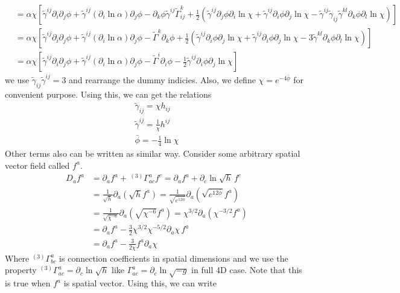 \documentclass[prd]{revtex4}
\begin{document}
\begin{align}
				&=\alpha \chi [ \tilde{\gamma}^{ij} \partial_i \partial_j \phi +  \tilde{\gamma}^{ij} (\partial_i \ln \alpha) \partial_j \phi - \partial_k \phi \tilde{\gamma}^{ij} \tilde{\Gamma}_{ij}^k + \frac{1}{2}( \tilde{\gamma}^{ij} \partial_j \phi \partial_i \ln \chi + \tilde{\gamma}^{ij} \partial_i \phi \partial_j \ln \chi -\tilde{\gamma}^{ij} \tilde{\gamma}_{ij} \tilde{\gamma}^{kl} \partial_k \phi \partial_l \ln \chi)] \nonumber \\
				&=\alpha \chi [ \tilde{\gamma}^{ij} \partial_i \partial_j \phi +  \tilde{\gamma}^{ij} (\partial_i \ln \alpha) \partial_j \phi - \tilde{\Gamma}^k \partial_k \phi + \frac{1}{2}( \tilde{\gamma}^{ij} \partial_i \phi \partial_j \ln \chi +  \tilde{\gamma}^{ij} \partial_i \phi \partial_j \ln \chi -3 \tilde{\gamma}^{kl} \partial_k \phi \partial_l \ln \chi)] \nonumber \\
				&=\alpha \chi [ \tilde{\gamma}^{ij} \partial_i \partial_j \phi +   \tilde{\gamma}^{ij} (\partial_i \ln \alpha) \partial_j \phi -  \tilde{\Gamma}^i \partial_i \phi - \frac{1}{2} \tilde{\gamma}^{ij} \partial_i \phi \partial_j \ln \chi ]
\end{align}
we use $\tilde{\gamma}_{ij} \tilde{\gamma}^{ij} = 3$ and rearrange the dummy indicies. Also, we define $\chi = e^{-4 \bar{\phi}}$ for convenient purpose. Using this, we can get the relations
\begin{align}
\tilde{\gamma}_{ij} = \chi h_{ij} \\
\tilde{\gamma}^{ij} = \frac{1}{\chi} h^{ij} \\
\bar{\phi} = -\frac{1}{4} \ln \chi
\end{align}
Other terms also can be written as similar way. Consider some arbitrary spatial vector field called $f^a$.
\begin{align}
D_a f^a &= \partial_a f^a +\,^{(3)}\Gamma_{ac}^a f^c = \partial_a f^a +\partial_c \ln \sqrt{h} \, f^c \nonumber \\
	     &= \frac{1}{\sqrt{h}} \partial_a (\sqrt{h} f^a) = \frac{1}{\sqrt{e^{12 \bar{\phi}}}} \partial_a (\sqrt{e^{12 \bar{\phi}}} f^a)  \nonumber \\
	     &=\frac{1}{\sqrt{\chi^{-6}}} \partial_a (\sqrt{\chi^{-6}} f^a) = \chi^{3/2} \partial_a (\chi^{-3/2} f^a) \nonumber \\
	     &=\partial_a f^a -\frac{3}{2} \chi^{3/2} \chi^{-5/2} \partial_a \chi \, f^a \nonumber \\
	     &=\partial_a f^a - \frac{3}{2 \chi} f^a \partial_a \chi
\end{align}
Where $^{(3)}\Gamma_{bc}^a$ is connection coefficients in spatial dimensions and we use the property $^{(3)}\Gamma_{ac}^a=\partial_c \ln \sqrt{h}$ like $\Gamma_{ac}^a = \partial_c \ln \sqrt{-g}$ in full 4D case. Note that this is true when $f^a$ is spatial vector. Using this, we can write
\end{document}

